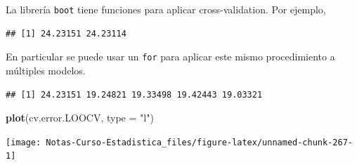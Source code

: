 \documentclass[
  12pt,
]{book}
\newenvironment{Shaded}{\begin{snugshade}}{\end{snugshade}}
\newcommand{\ControlFlowTok}[1]{\textcolor[rgb]{0.13,0.29,0.53}{\textbf{#1}}}
\newcommand{\DataTypeTok}[1]{\textcolor[rgb]{0.13,0.29,0.53}{#1}}
\newcommand{\DecValTok}[1]{\textcolor[rgb]{0.00,0.00,0.81}{#1}}
\newcommand{\KeywordTok}[1]{\textcolor[rgb]{0.13,0.29,0.53}{\textbf{#1}}}
\newcommand{\NormalTok}[1]{#1}
\newcommand{\OperatorTok}[1]{\textcolor[rgb]{0.81,0.36,0.00}{\textbf{#1}}}
\newcommand{\StringTok}[1]{\textcolor[rgb]{0.31,0.60,0.02}{#1}}
\theoremstyle{definition}
\theoremstyle{definition}
\theoremstyle{definition}
\theoremstyle{remark}
\begin{document}
La librería \texttt{boot} tiene funciones para aplicar cross-validation. Por ejemplo,

\begin{Shaded}
\end{Shaded}

\begin{verbatim}
## [1] 24.23151 24.23114
\end{verbatim}

En particular se puede usar un \texttt{for} para aplicar este mismo procedimiento a múltiples modelos.

\begin{Shaded}
\end{Shaded}

\begin{verbatim}
## [1] 24.23151 19.24821 19.33498 19.42443 19.03321
\end{verbatim}

\begin{Shaded}
\begin{Highlighting}[]
\KeywordTok{plot}\NormalTok{(cv.error.LOOCV, }\DataTypeTok{type =} \StringTok{"l"}\NormalTok{)}
\end{Highlighting}
\end{Shaded}

\begin{center}\texttt{[image: Notas-Curso-Estadistica\_files/figure-latex/unnamed-chunk-267-1]} \end{center}
\end{document}
